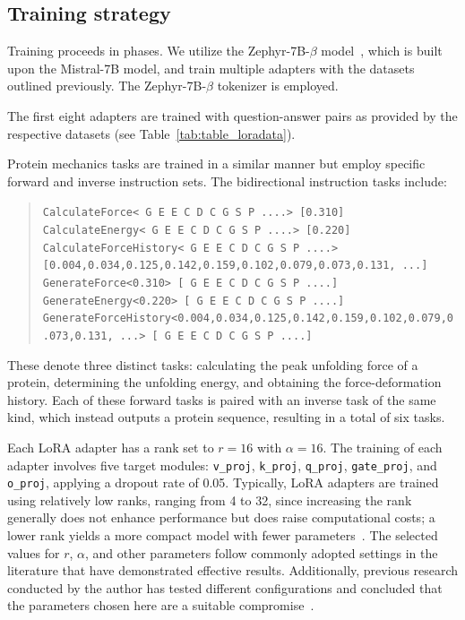 \subsection{Training strategy} Training proceeds in phases. We utilize the Zephyr-7B-$\beta$ model~\cite{HuggingFaceH4/zephyr-7b-betaFace}, which is built upon the Mistral-7B model\cite{Jiang2023Mistral7B}, and train multiple adapters with the datasets outlined previously. The Zephyr-7B-$\beta$ tokenizer is employed.

The first eight adapters are trained with question-answer pairs as provided by the respective datasets (see Table~\ref{tab:table_loradata}).

Protein mechanics tasks are trained in a similar manner but employ specific forward and inverse instruction sets. The bidirectional instruction tasks include:

\begin{quote}
\tiny {\texttt{CalculateForce< G E E C D C G S P ....> [0.310]\\
CalculateEnergy< G E E C D C G S P ....> [0.220]\\ 
CalculateForceHistory< G E E C D C G S P ....> [0.004,0.034,0.125,0.142,0.159,0.102,0.079,0.073,0.131, ...]\\
GenerateForce<0.310>\,[ G E E C D C G S P ....]\\
GenerateEnergy<0.220>\,[ G E E C D C G S P ....]\\
GenerateForceHistory<0.004,0.034,0.125,0.142,0.159,0.102,0.079,0.073,0.131, ...>\,[ G E E C D C G S P ....] }}
\end{quote}

These denote three distinct tasks: calculating the peak unfolding force of a protein, determining the unfolding energy, and obtaining the force-deformation history. Each of these forward tasks is paired with an inverse task of the same kind, which instead outputs a protein sequence, resulting in a total of six tasks.

Each LoRA adapter has a rank set to $r=16$ with $\alpha=16$. The training of each adapter involves five target modules: \texttt{v\_proj}, \texttt{k\_proj}, \texttt{q\_proj}, \texttt{gate\_proj}, and \texttt{o\_proj}, applying a dropout rate of 0.05. Typically, LoRA adapters are trained using relatively low ranks, ranging from 4 to 32, since increasing the rank generally does not enhance performance but does raise computational costs; a lower rank yields a more compact model with fewer parameters~\cite{hu2021lora}. The selected values for $r$, $\alpha$, and other parameters follow commonly adopted settings in the literature that have demonstrated effective results. Additionally, previous research conducted by the author has tested different configurations and concluded that the parameters chosen here are a suitable compromise~\cite{Luu2023BioinspiredLLM:Materials}.

